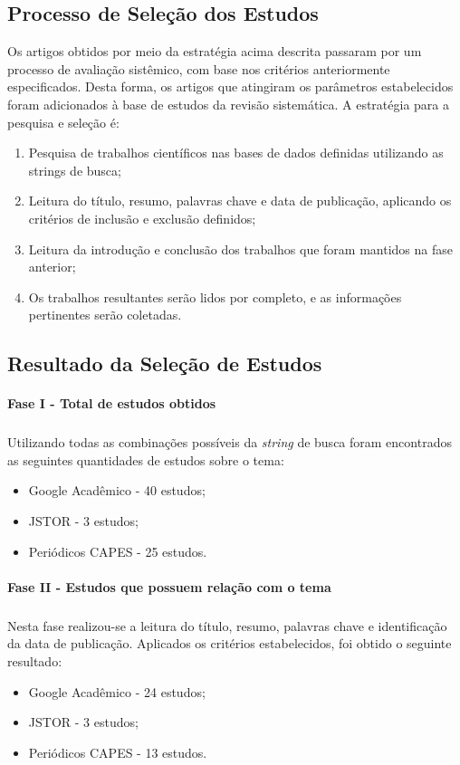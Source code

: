 \subsection{Processo de Seleção dos Estudos}
\quad Os artigos obtidos por meio da estratégia acima descrita passaram por um processo de avaliação sistêmico, com base nos critérios anteriormente especificados.
Desta forma, os artigos que atingiram os parâmetros estabelecidos foram adicionados à base de estudos da revisão sistemática. A estratégia para a pesquisa e seleção é:
\begin{enumerate}
  \item Pesquisa de trabalhos científicos nas bases de dados definidas utilizando as strings de busca;
  \item Leitura do título, resumo, palavras chave e data de publicação, aplicando os critérios de inclusão e exclusão definidos;
  \item Leitura da introdução e conclusão dos trabalhos que foram mantidos na fase anterior;
  \item Os trabalhos resultantes serão lidos por completo, e as informações pertinentes serão coletadas.
\end{enumerate}

\subsection{Resultado da Seleção de Estudos}
\paragraph{Fase I - Total de estudos obtidos}
\subparagraph{}
\quad Utilizando todas as combinações possíveis da \textit{string} de busca foram encontrados as seguintes quantidades de estudos sobre o tema:
\begin{itemize}
  \item Google Acadêmico - 40 estudos;
  \item JSTOR - 3 estudos;
  \item Periódicos CAPES - 25 estudos.
\end{itemize}
\paragraph{Fase II - Estudos que possuem relação com o tema}
\subparagraph{}
\quad Nesta fase realizou-se a leitura do título, resumo, palavras chave e identificação da data de publicação.
Aplicados os critérios estabelecidos, foi obtido o seguinte resultado:
\begin{itemize}
  \item Google Acadêmico - 24 estudos;
  \item JSTOR - 3 estudos;
  \item Periódicos CAPES - 13 estudos.
\end{itemize}
